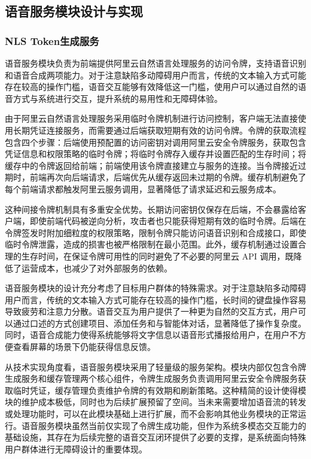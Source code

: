 
\subsection{语音服务模块设计与实现}

\subsubsection{NLS Token生成服务}

\par 语音服务模块负责为前端提供阿里云自然语言处理服务的访问令牌，支持语音识别和语音合成两项能力。对于注意缺陷多动障碍用户而言，传统的文本输入方式可能存在较高的操作门槛，语音交互能够有效降低这一门槛，使用户可以通过自然的语音方式与系统进行交互，提升系统的易用性和无障碍体验。

\par 由于阿里云自然语言处理服务采用临时令牌机制进行访问控制，客户端无法直接使用长期凭证连接服务，而需要通过后端获取短期有效的访问令牌。令牌的获取流程包含四个步骤：后端使用预配置的访问密钥对调用阿里云安全令牌服务，获取包含凭证信息和权限策略的临时令牌；将临时令牌存入缓存并设置匹配的生存时间；将缓存中的令牌返回给前端；前端使用该令牌直接建立与服务的连接。当令牌接近过期时，前端再次向后端请求，后端优先从缓存返回未过期的令牌。缓存机制避免了每个前端请求都触发阿里云服务调用，显著降低了请求延迟和云服务成本。

\par 这种间接令牌机制具有多重安全优势。长期访问密钥仅保存在后端，不会暴露给客户端，即使前端代码被逆向分析，攻击者也只能获得短期有效的临时令牌。后端在令牌签发时附加细粒度的权限策略，限制令牌只能访问语音识别和合成接口，即使临时令牌泄露，造成的损害也被严格限制在最小范围。此外，缓存机制通过设置合理的生存时间，在保证令牌可用性的同时避免了不必要的阿里云 API 调用，既降低了运营成本，也减少了对外部服务的依赖。

\par 语音服务模块的设计充分考虑了目标用户群体的特殊需求。对于注意缺陷多动障碍用户而言，传统的文本输入方式可能存在较高的操作门槛，长时间的键盘操作容易导致疲劳和注意力分散。语音交互为用户提供了一种更为自然的交互方式，用户可以通过口述的方式创建项目、添加任务和与智能体对话，显著降低了操作复杂度。同时，语音合成能力使得系统能够将文字信息以语音形式播报给用户，在用户不方便查看屏幕的场景下仍能获得信息反馈。

\par 从技术实现角度看，语音服务模块采用了轻量级的服务架构。模块内部仅包含令牌生成服务和缓存管理两个核心组件，令牌生成服务负责调用阿里云安全令牌服务获取临时凭证，缓存管理负责维护令牌的有效期和刷新策略。这种精简的设计使得模块的维护成本极低，同时也为后续扩展预留了空间。当未来需要增加语音流的转发或处理功能时，可以在此模块基础上进行扩展，而不会影响其他业务模块的正常运行。语音服务模块虽然当前仅实现了令牌生成功能，但作为系统多模态交互能力的基础设施，其存在为后续完整的语音交互闭环提供了必要的支撑，是系统面向特殊用户群体进行无障碍设计的重要体现。

